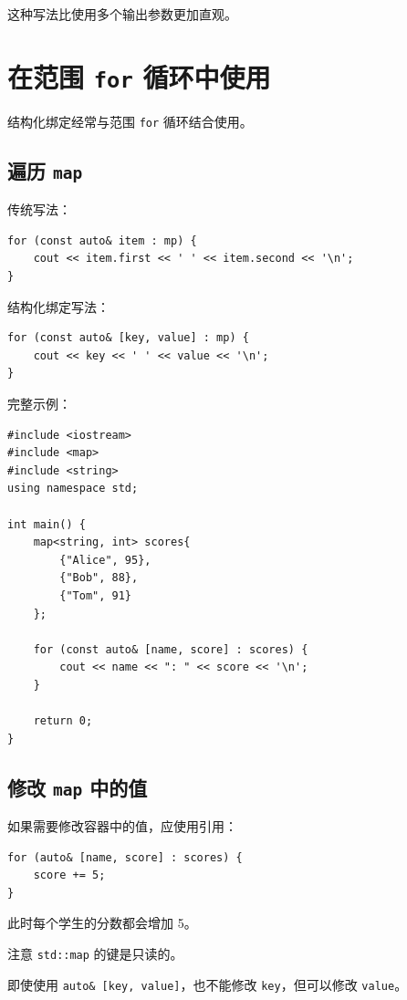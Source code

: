\documentclass[UTF8,12pt,a4paper]{ctexart}
\begin{document}
这种写法比使用多个输出参数更加直观。

\section{在范围 \texttt{for} 循环中使用}

结构化绑定经常与范围 \texttt{for} 循环结合使用。

\subsection{遍历 \texttt{map}}

传统写法：

\begin{lstlisting}
for (const auto& item : mp) {
    cout << item.first << ' ' << item.second << '\n';
}
\end{lstlisting}

结构化绑定写法：

\begin{lstlisting}
for (const auto& [key, value] : mp) {
    cout << key << ' ' << value << '\n';
}
\end{lstlisting}

完整示例：

\begin{lstlisting}
#include <iostream>
#include <map>
#include <string>
using namespace std;

int main() {
    map<string, int> scores{
        {"Alice", 95},
        {"Bob", 88},
        {"Tom", 91}
    };

    for (const auto& [name, score] : scores) {
        cout << name << ": " << score << '\n';
    }

    return 0;
}
\end{lstlisting}

\subsection{修改 \texttt{map} 中的值}

如果需要修改容器中的值，应使用引用：

\begin{lstlisting}
for (auto& [name, score] : scores) {
    score += 5;
}
\end{lstlisting}

此时每个学生的分数都会增加 5。

\begin{warningbox}{注意}
\texttt{std::map} 的键是只读的。

即使使用 \texttt{auto\& [key, value]}，也不能修改 \texttt{key}，但可以修改 \texttt{value}。
\end{warningbox}
\end{document}
